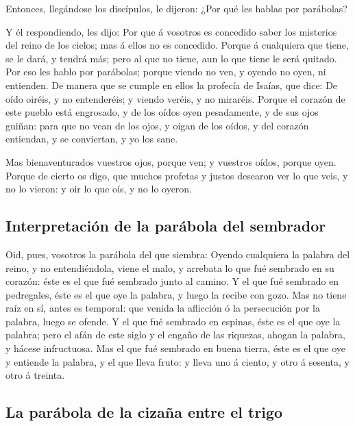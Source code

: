  Entonces, llegándose los discípulos, le dijeron: ¿Por qué
les hablas por parábolas?

 Y él respondiendo, les dijo: Por que á vosotros es
concedido saber los misterios del reino de los cielos; mas á ellos no es
concedido.  Porque á cualquiera que tiene, se le dará, y
tendrá más; pero al que no tiene, aun lo que tiene le será quitado.
 Por eso les hablo por parábolas; porque viendo no ven, y
oyendo no oyen, ni entienden.  De manera que se cumple en
ellos la profecía de Isaías, que dice: De oído oiréis, y no entenderéis;
y viendo veréis, y no miraréis.  Porque el corazón de este
pueblo está engrosado, y de los oídos oyen pesadamente, y de sus ojos
guiñan: para que no vean de los ojos, y oigan de los oídos, y del
corazón entiendan, y se conviertan, y yo los sane.

 Mas bienaventurados vuestros ojos, porque ven; y vuestros
oídos, porque oyen.  Porque de cierto os digo, que muchos
profetas y justos desearon ver lo que veis, y no lo vieron: y oir lo que
oís, y no lo oyeron.

\hypertarget{interpretaciuxf3n-de-la-paruxe1bola-del-sembrador}{%
\subsection{Interpretación de la parábola del
sembrador}\label{interpretaciuxf3n-de-la-paruxe1bola-del-sembrador}}

 Oid, pues, vosotros la parábola del que siembra:
 Oyendo cualquiera la palabra del reino, y no
entendiéndola, viene el malo, y arrebata lo que fué sembrado en su
corazón: éste es el que fué sembrado junto al camino.  Y el
que fué sembrado en pedregales, éste es el que oye la palabra, y luego
la recibe con gozo.  Mas no tiene raíz en sí, antes es
temporal: que venida la aflicción ó la persecución por la palabra, luego
se ofende.  Y el que fué sembrado en espinas, éste es el
que oye la palabra; pero el afán de este siglo y el engaño de las
riquezas, ahogan la palabra, y hácese infructuosa.  Mas el
que fué sembrado en buena tierra, éste es el que oye y entiende la
palabra, y el que lleva fruto: y lleva uno á ciento, y otro á sesenta, y
otro á treinta.

\hypertarget{la-paruxe1bola-de-la-cizauxf1a-entre-el-trigo}{%
\subsection{La parábola de la cizaña entre el
trigo}\label{la-paruxe1bola-de-la-cizauxf1a-entre-el-trigo}}

